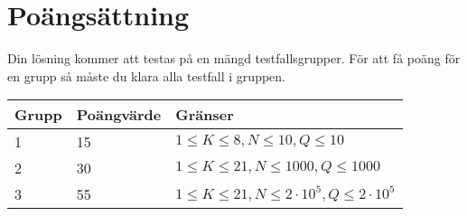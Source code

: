 \section*{Poängsättning}
Din lösning kommer att testas på en mängd testfallsgrupper.
För att få poäng för en grupp så måste du klara alla testfall i gruppen.

\noindent
\begin{tabular}{| l | l | l |}
\hline
Grupp & Poängvärde & Gränser \\ \hline
1     & 15         & $1 \le K \le 8, N \leq 10, Q \leq 10$\\ \hline
2     & 30         & $1 \le K \le 21, N \leq 1000, Q \leq 1000$\\ \hline
3     & 55         & $1 \le K \le 21, N \leq 2\cdot 10^5, Q \leq 2\cdot 10^5$\\ \hline
\end{tabular}
